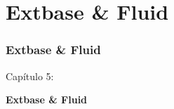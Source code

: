 %

\section{Extbase \& Fluid}
\begin{frame}[fragile]
	\frametitle{Extbase \& Fluid}

	\begin{center}\huge{Capítulo 5:}\end{center}
	\begin{center}\huge{\color{typo3darkgrey}\textbf{Extbase \& Fluid}}\end{center}

\end{frame}


